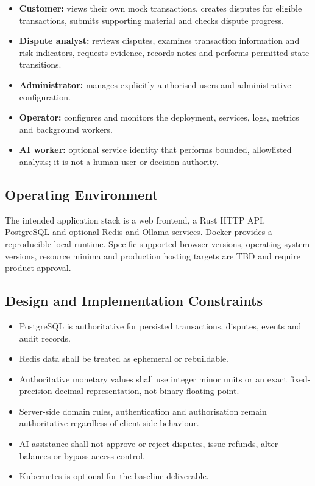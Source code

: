 \documentclass[11pt,a4paper]{article}
\begin{document}
\begin{itemize}
    \item \textbf{Customer:} views their own mock transactions, creates
    disputes for eligible transactions, submits supporting material
    and checks dispute progress.
    \item \textbf{Dispute analyst:} reviews disputes, examines
    transaction information and risk indicators, requests evidence,
    records notes and performs permitted state transitions.
    \item \textbf{Administrator:} manages explicitly authorised users
    and administrative configuration.
    \item \textbf{Operator:} configures and monitors the deployment,
    services, logs, metrics and background workers.
    \item \textbf{AI worker:} optional service identity that performs
    bounded, allowlisted analysis; it is not a human user or decision
    authority.
\end{itemize}

\subsection{Operating Environment}

The intended application stack is a web frontend, a Rust HTTP API,
PostgreSQL and optional Redis and Ollama services. Docker provides a
reproducible local runtime. Specific supported browser versions,
operating-system versions, resource minima and production hosting
targets are TBD and require product approval.

\subsection{Design and Implementation Constraints}

\begin{itemize}
    \item PostgreSQL is authoritative for persisted transactions,
    disputes, events and audit records.
    \item Redis data shall be treated as ephemeral or rebuildable.
    \item Authoritative monetary values shall use integer minor units
    or an exact fixed-precision decimal representation, not binary
    floating point.
    \item Server-side domain rules, authentication and authorisation
    remain authoritative regardless of client-side behaviour.
    \item AI assistance shall not approve or reject disputes, issue
    refunds, alter balances or bypass access control.
    \item Kubernetes is optional for the baseline deliverable.
\end{itemize}
\end{document}
